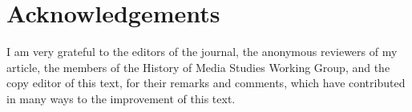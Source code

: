 \documentclass{tufte-handout}
\begin{document}
\vspace{2em}

\hypertarget{acknowledgements}{%
\section{Acknowledgements}\label{acknowledgements}}

I am very grateful to the editors of the journal, the anonymous
reviewers of my article, the members of the History of Media Studies
Working Group, and the copy editor of this text, for their remarks and
comments, which have contributed in many ways to the improvement of this
text.
\end{document}
